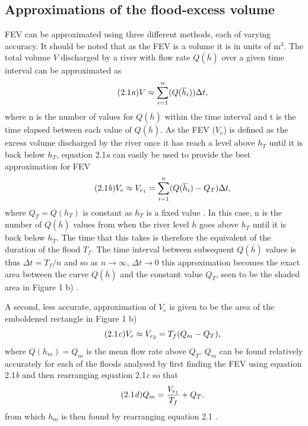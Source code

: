 \documentclass[11pt,a4paper]{article}
\begin{document}
\subsection{Approximations of the flood-excess volume}
FEV can be approximated using three different methods, each of varying accuracy. It should be noted that as the FEV is a volume it is in units of m$^3$. The total volume $V$ discharged by a river with flow rate $Q(\overline{h})$ over a given time interval can be approximated as
\begin{equation}\tag{2.1\textit{a}}
V\approx \sum_{i=1}^{n}(Q(\overline{h}_i))\Delta t,
\end{equation}
where n is the number of values for $Q(\overline{h})$ within the time interval and t is the time elapsed between each value of $Q(\overline{h})$. As the FEV ($V_e$) is defined as the excess volume discharged by the river once it has reach a level above $h_T$ until it is back below $h_T$, equation 2.1\textit{a} can easily be used to provide the best approximation for FEV
\begin{equation}\tag{2.1\textit{b}}
V_e\approx V_{e_1} = \sum_{i=1}^{n}(Q(\overline{h}_i)-Q_T)\Delta t,
\end{equation}
where $Q_T=Q(h_T)$ is constant as $h_T$ is a fixed value \cite{Calder-Don}. In this case, n is the number of $Q(\overline{h})$ values from when the river level $\overline{h}$ goes above $h_T$ until it is back below $h_T$. The time that this takes is therefore the equivalent of the duration of the flood $T_f$. The time interval between subsequent $Q(\overline{h})$ values is thus $\Delta t=T_f/n$ and so as $n \to \infty$, $\Delta t \to 0$ this approximation becomes the exact area between the curve $Q(\overline{h})$ and the constant value $Q_T$, seen to be the shaded area in Figure 1 b) \cite{Calder-Don}.

A second, less accurate, approximation of $V_e$ is given to be the area of the emboldened rectangle in Figure 1 b)
\begin{equation}\tag{2.1\textit{c}}
V_e \approx V_{e_2} = T_f(Q_m-Q_T),
\end{equation}
where $Q(h_m)=Q_m$ is the mean flow rate above $Q_T$. $Q_m$ can be found relatively accurately for each of the floods analysed by first finding the FEV using equation 2.1\textit{b} and then rearranging equation 2.1\textit{c} so that
\begin{equation}\tag{2.1\textit{d}}
Q_m= \frac{V_{e_1}}{T_f}+Q_T,
\end{equation}
from which $h_m$ is then found by rearranging equation 2.1 \cite{Aire}.
\end{document}
